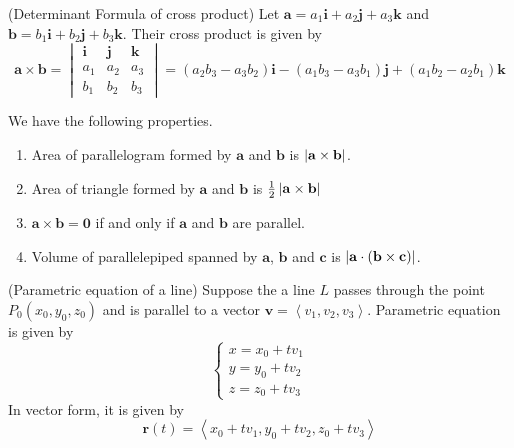 \documentclass{huhtakm-template-book}
\begin{document}
\begin{thm}(Determinant Formula of cross product)
    Let $\mathbf{a}=a_{1}\mathbf{i}+a_{2}\mathbf{j}+a_{3}\mathbf{k}$ and $\mathbf{b}=b_{1}\mathbf{i}+b_{2}\mathbf{j}+b_{3}\mathbf{k}$. Their cross product is given by
    \begin{equation*}
        \mathbf{a}\times\mathbf{b}=\begin{vmatrix}
            \mathbf{i} & \mathbf{j} & \mathbf{k}\\
            a_{1} & a_{2} & a_{3}\\
            b_{1} & b_{2} & b_{3}
        \end{vmatrix}=(a_{2}b_{3}-a_{3}b_{2})\mathbf{i}-(a_{1}b_{3}-a_{3}b_{1})\mathbf{j}+(a_{1}b_{2}-a_{2}b_{1})\mathbf{k}
    \end{equation*}
\end{thm}
\begin{lem}
    We have the following properties.
    \begin{enumerate}
        \item Area of parallelogram formed by $\mathbf{a}$ and $\mathbf{b}$ is $\left|{\mathbf{a}\times\mathbf{b}}\right|$.
        \item Area of triangle formed by $\mathbf{a}$ and $\mathbf{b}$ is $\frac{1}{2}\left|{\mathbf{a}\times\mathbf{b}}\right|$
        \item $\mathbf{a}\times\mathbf{b}=\mathbf{0}$ if and only if $\mathbf{a}$ and $\mathbf{b}$ are parallel.
        \item Volume of parallelepiped spanned by $\mathbf{a}$, $\mathbf{b}$ and $\mathbf{c}$ is $\left|{\mathbf{a}\cdot(\mathbf{b}\times\mathbf{c})}\right|$.
    \end{enumerate}
\end{lem}
\begin{defn}(Parametric equation of a line)
    Suppose the a line $L$ passes through the point $P_{0}(x_{0},y_{0},z_{0})$ and is parallel to a vector $\mathbf{v}=\left<v_{1},v_{2},v_{3}\right>$. Parametric equation is given by
    \begin{equation*}
        \begin{cases}
            x=x_{0}+tv_{1}\\
            y=y_{0}+tv_{2}\\
            z=z_{0}+tv_{3}
        \end{cases}
    \end{equation*}
    In vector form, it is given by
    \begin{equation*}
        \mathbf{r}(t)=\left<x_{0}+tv_{1},y_{0}+tv_{2},z_{0}+tv_{3}\right>
    \end{equation*}
\end{defn}
\end{document}

